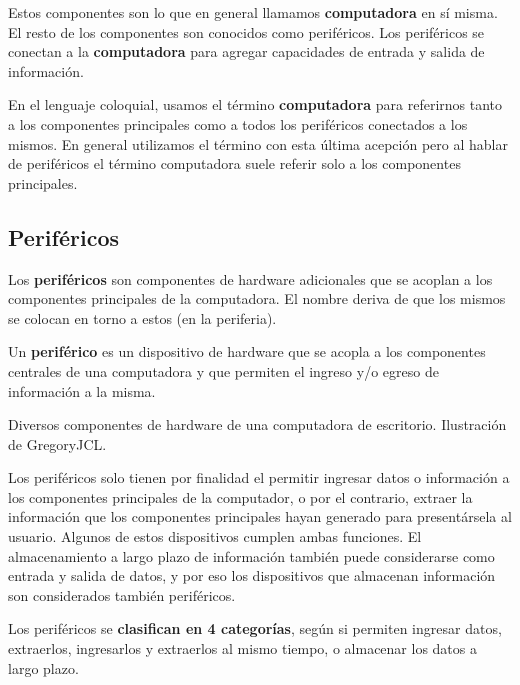 Estos componentes son lo que en general llamamos \textbf{computadora} en sí
misma. El resto de los componentes son conocidos como periféricos. Los
periféricos se conectan a la \textbf{computadora} para agregar capacidades de
entrada y salida de información.\autocite[cap. 2]{gookin_2006}

En el lenguaje coloquial, usamos el término \textbf{computadora} para referirnos
tanto a los componentes principales como a todos los periféricos conectados a
los mismos. En general utilizamos el término con esta última acepción pero al
hablar de periféricos el término computadora suele referir solo a los
componentes principales.

\subsection{Periféricos}
\label{chap:computadoras:subsec:perifericos}

Los \textbf{periféricos} son componentes de hardware adicionales que se acoplan
a los componentes principales de la computadora. El nombre deriva de que los
mismos se colocan en torno a estos (en la periferia).

\begin{definition} Un \textbf{periférico} es un
    dispositivo de hardware que se acopla a los componentes centrales de una
    computadora y que permiten el ingreso y/o egreso de información a la
    misma.\autocite[vid. p. 363]{laplante_2000}
\end{definition}

{Diversos componentes de hardware de una computadora de escritorio.}
{Ilustración de GregoryJCL.}

Los periféricos solo tienen por finalidad el permitir ingresar datos o
información a los componentes principales de la computador, o por el contrario,
extraer la información que los componentes principales hayan generado para
presentársela al usuario. Algunos de estos dispositivos cumplen ambas funciones.
El almacenamiento a largo plazo de información también puede considerarse como
entrada y salida de datos, y por eso los dispositivos que almacenan información
son considerados también periféricos.

Los periféricos se \textbf{clasifican en 4 categorías}, según si permiten
ingresar datos, extraerlos, ingresarlos y extraerlos al mismo tiempo, o
almacenar los datos a largo plazo.

